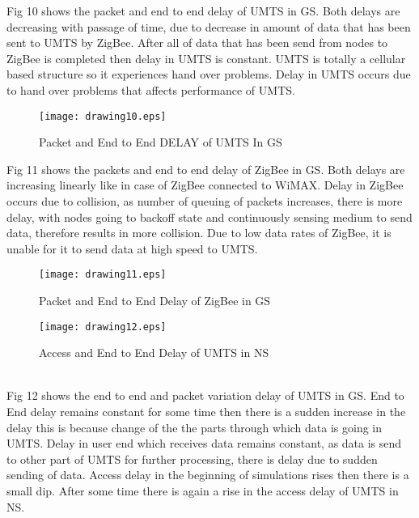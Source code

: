 \documentclass[11pt, conference, compsocconf, onecolumn]{IEEEtran}
\begin{document}
Fig 10 shows the packet and end to end delay of UMTS in GS. Both delays are decreasing with passage of time, due to decrease in amount of data that has been sent to UMTS by ZigBee. After all of data that has been send from nodes to ZigBee is completed then delay in UMTS is constant. UMTS is totally a cellular based structure so it experiences hand over problems. Delay in UMTS occurs due to hand over problems that affects performance of UMTS.
\begin{figure}[!t]
\centering
\caption{Packet and End to End DELAY of UMTS In GS}
\texttt{[image: drawing10.eps]}
\end{figure}

Fig 11 shows the packets and end to end delay of ZigBee in GS. Both delays are increasing linearly like in case of ZigBee connected to WiMAX. Delay in ZigBee occurs due to collision, as number of queuing of packets increases, there is more delay, with nodes going to backoff state and continuously sensing medium to send data, therefore results in more collision. Due to low data rates of ZigBee, it is unable for it to send data at high speed to UMTS.
\begin{figure}[!t]
\centering
\caption{Packet and End to End Delay of ZigBee in GS}
\texttt{[image: drawing11.eps]}
\end{figure}
\begin{figure}[!t]
\centering
\caption{Access and End to End Delay of UMTS in NS}
\texttt{[image: drawing12.eps]}
\end{figure}
\\
\indent Fig 12 shows the end to end and packet variation delay of UMTS in GS. End to End delay remains constant for some time then there is a sudden increase in the delay this is because change of the the parts through which data is going in UMTS. Delay in user end which receives data remains constant, as data is send to other part of UMTS for further processing, there is delay due to sudden sending of data. Access delay in the beginning of simulations rises then there is a small dip. After some time there is again a rise in the access delay of UMTS in NS.
\end{document}
